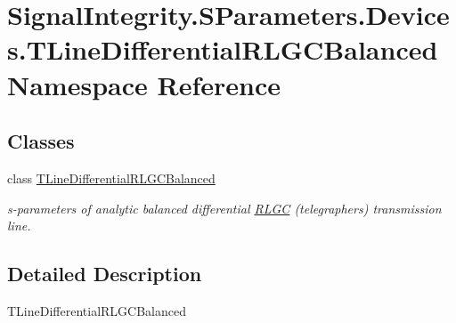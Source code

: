 \hypertarget{namespaceSignalIntegrity_1_1SParameters_1_1Devices_1_1TLineDifferentialRLGCBalanced}{}\section{Signal\+Integrity.\+S\+Parameters.\+Devices.\+T\+Line\+Differential\+R\+L\+G\+C\+Balanced Namespace Reference}
\label{namespaceSignalIntegrity_1_1SParameters_1_1Devices_1_1TLineDifferentialRLGCBalanced}
\subsection*{Classes}
\begin{DoxyCompactItemize}
\item 
class \hyperlink{classSignalIntegrity_1_1SParameters_1_1Devices_1_1TLineDifferentialRLGCBalanced_1_1TLineDifferentialRLGCBalanced}{T\+Line\+Differential\+R\+L\+G\+C\+Balanced}
\begin{DoxyCompactList}\small\item\em s-\/parameters of analytic balanced differential \hyperlink{namespaceSignalIntegrity_1_1SParameters_1_1RLGC}{R\+L\+GC} (telegrapher\textquotesingle{}s) transmission line. \end{DoxyCompactList}\end{DoxyCompactItemize}


\subsection{Detailed Description}
\begin{DoxyVerb}TLineDifferentialRLGCBalanced\end{DoxyVerb}
 
